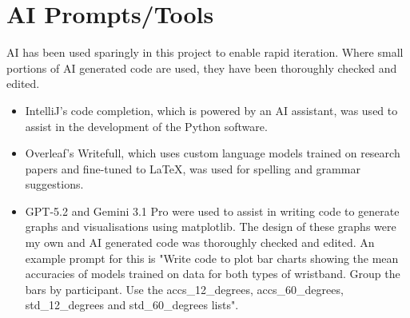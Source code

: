 \documentclass[ oneside,%
                    author={Jack Jarvis},
                    degree={BSc},
                     title={FlexIR: Flexible PCB Wristbands for Infrared Based Gesture Recognition},
                    unit={COMS30045},
                    subtitle={Investigating the Effect of LED Viewing Angle on Gesture Classification in Infrared Sensing Systems}]{dissertation}
\begin{document}
%
%
%

\backmatter





\appendix

\chapter{AI Prompts/Tools}
\label{appx:ai_prompt}

AI has been used sparingly in this project to enable rapid iteration. Where small portions of AI generated code are used, they have been thoroughly checked and edited.

\begin{itemize}
    \item IntelliJ's code completion, which is powered by an AI assistant, was used to assist in the development of the Python software.
    \item Overleaf's Writefull, which uses custom language models trained on research papers and fine-tuned to LaTeX, was used for spelling and grammar suggestions.
    \item GPT-5.2 and Gemini 3.1 Pro were used to assist in writing code to generate graphs and visualisations using matplotlib. The design of these graphs were my own and AI generated code was thoroughly checked and edited. An example prompt for this is "Write code to plot bar charts showing the mean accuracies of models trained on data for both types of wristband. Group the bars by participant. Use the accs\_12\_degrees, accs\_60\_degrees, std\_12\_degrees and std\_60\_degrees lists".
\end{itemize}
\end{document}
